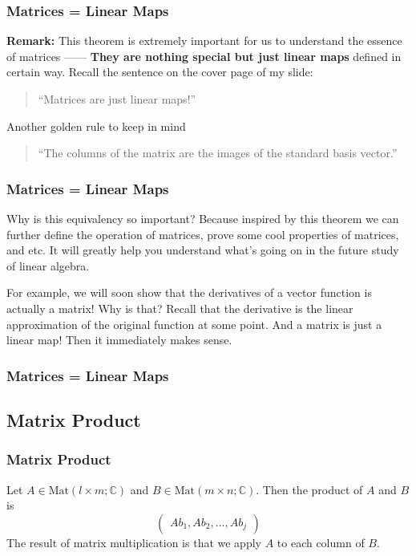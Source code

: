 \documentclass[12pt, t]{beamer}
\newcommand{\C}{\mathbb{C}} \newcommand{\F}{\mathbb{F}} \newcommand{\R}{\mathbb{R}} \newcommand{\Q}{\mathbb{Q}}
\newcommand{\remark}{\textbf{Remark: }}
\begin{document}
\begin{frame}
    \frametitle{\textbf{Matrices = Linear Maps}}
    \remark This theorem is extremely important for us to understand the essence of matrices —— \textbf{They are nothing special but just linear maps} defined in certain way. Recall the sentence on the cover page of my slide:

    \begin{quote}
        \center
        ``Matrices are just linear maps!''\\
    \end{quote}
    Another golden rule to keep in mind
    \begin{quote}
        ``The columns of the matrix are the images of the standard basis vector.”
    \end{quote}
\end{frame}

\begin{frame}
    \frametitle{\textbf{Matrices = Linear Maps}}
    Why is this equivalency so important? Because inspired by this theorem we can further define the operation of matrices, prove some cool properties of matrices, and etc. It will greatly help you understand what's going on in the future study of linear algebra.

    For example, we will soon show that the derivatives of a vector function is actually a matrix! Why is that? Recall that the derivative is the linear approximation of the original function at some point. And a matrix is just a linear map! Then it immediately makes sense.

\end{frame}

\begin{frame}
    \frametitle{\textbf{Matrices = Linear Maps}}


\end{frame}

\subsection{Matrix Product}
\begin{frame}
    \frametitle{Matrix Product}
    Let $A\in\text{Mat}(l\times m;\C)$ and $B\in\text{Mat}(m\times n;\C)$. Then the product of $A$ and $B$ is
    $$\begin{pmatrix}
            Ab_1,Ab_2,...,Ab_j
        \end{pmatrix}$$
    The result of matrix multiplication is that we apply $A$ to each column of $B$.
\end{frame}
\end{document}
